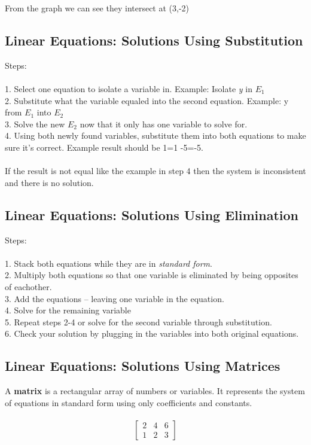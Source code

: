 \documentclass{article}
\begin{document}
From the graph we can see they intersect at (3,-2)
\newpage
\subsection{Linear Equations: Solutions Using Substitution}
Steps: \\ \\
1. Select one equation to isolate a variable in. Example: Isolate \textit{y} in $E_1$\\
2. Substitute what the variable equaled into the second equation. Example: y from $E_1$ into $E_2$\\
3. Solve the new $E_2$ now that it only has one variable to solve for.\\
4. Using both newly found variables, substitute them into both equations to make sure it's correct. Example result should be 1=1 -5=-5.\\
\\
If the result is not equal like the example in step 4 then the system is inconsistent and there is no solution.

\subsection{Linear Equations: Solutions Using Elimination}
Steps: \\\\
1. Stack both equations while they are in \textit{standard form}.\\
2. Multiply both equations so that one variable is eliminated by being opposites of eachother.\\
3. Add the equations -- leaving one variable in the equation.\\
4. Solve for the remaining variable\\
5. Repeat steps 2-4 or solve for the second variable through substitution.\\
6. Check your solution by plugging in the variables into both original equations.\\

\subsection{Linear Equations: Solutions Using Matrices}
A \textbf{matrix} is a rectangular array of numbers or variables. It represents the system of equations in standard form using only coefficients and constants.\\
\\
$$
\begin{bmatrix}
	2 & 4 & 6\\
	1 & 2 & 3
\end{bmatrix}
$$
\end{document}
